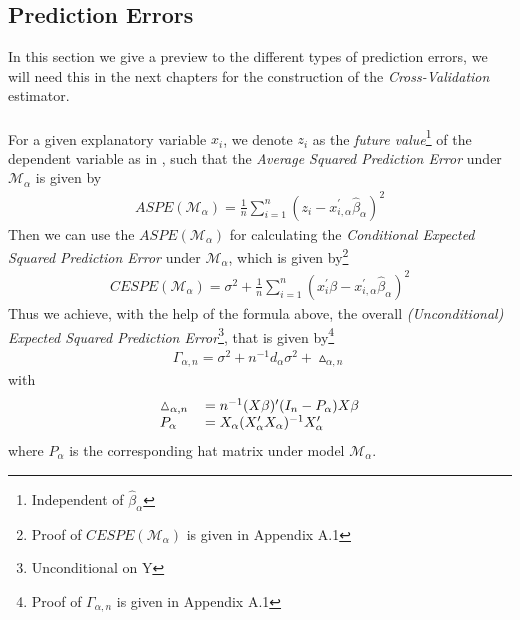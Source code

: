 \documentclass[Research_Module_ES.tex]{subfiles}
\begin{document}
\subsection{Prediction Errors}
In this section we give a preview to the different types of prediction errors, we will need this in the next chapters for the construction of the \textit{Cross-Validation} estimator.\\\\
For a given explanatory variable $x_i$, we denote $z_i$ as the \textit{future value}\footnote{Independent of $\hat{\beta}_\alpha$} of the dependent variable as in \cite{shao}, such that the \textit{Average Squared Prediction Error} under $\mathcal{M}_\alpha$ is given by
\begin{align}
ASPE(\mathcal{M}_\alpha)=\frac{1}{n}\sum_{i=1}^{n}(z_i-x_{i,\alpha}^\prime\hat{\beta}_\alpha)^2 \label{ASPE}
\end{align}
Then we can use the $ASPE(\mathcal{M}_\alpha)$ for calculating the \textit{Conditional Expected Squared Prediction Error} under $\mathcal{M}_\alpha$, which is given by\footnote{Proof of $CESPE(\mathcal{M}_\alpha)$ is given in Appendix A.1}
\begin{align*}
CESPE(\mathcal{M}_\alpha)=\sigma^2+\frac{1}{n}\sum_{i=1}^{n}(x_i^\prime\beta-x_{i,\alpha}^\prime\hat{\beta}_\alpha)^2
\end{align*}
Thus we achieve, with the help of the formula above, the overall \textit{(Unconditional) Expected Squared Prediction Error}\footnote{Unconditional on Y}, that is given by\footnote{Proof of $\Gamma_{\alpha,n}$ is given in Appendix A.1} 
\begin{align}
\Gamma_{\alpha,n}=\sigma^2+n^{-1}d_\alpha\sigma^2+\vartriangle_{\alpha,n} 
\end{align}
with
\begin{align*}
\begin{tabular}{ll}
$\vartriangle_{\alpha,n}$&$=n^{-1}(X\beta)^\prime(I_n-P_\alpha)X\beta$\\
$P_\alpha$&$=X_\alpha(X_\alpha^\prime X_\alpha)^{-1}X_\alpha^\prime$
\end{tabular}
\end{align*} 
where $P_\alpha$ is the corresponding hat matrix under model $\mathcal{M}_\alpha$.\\
\end{document}
